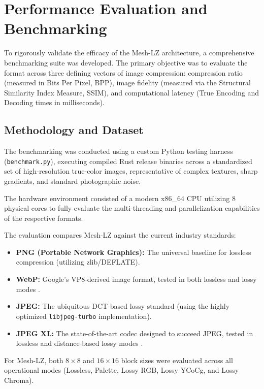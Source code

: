 \chapter{Performance Evaluation and Benchmarking}
\label{ch:evaluation}

To rigorously validate the efficacy of the Mesh-LZ architecture, a comprehensive benchmarking suite was developed. The primary objective was to evaluate the format across three defining vectors of image compression: compression ratio (measured in Bits Per Pixel, BPP), image fidelity (measured via the Structural Similarity Index Measure, SSIM), and computational latency (True Encoding and Decoding times in milliseconds).

\section{Methodology and Dataset}

The benchmarking was conducted using a custom Python testing harness (\texttt{benchmark.py}), executing compiled Rust release binaries across a standardized set of high-resolution true-color images, representative of complex textures, sharp gradients, and standard photographic noise. 

The hardware environment consisted of a modern x86\_64 CPU utilizing 8 physical cores to fully evaluate the multi-threading and parallelization capabilities of the respective formats. 

The evaluation compares Mesh-LZ against the current industry standards:
\begin{itemize}
    \item \textbf{PNG (Portable Network Graphics):} The universal baseline for lossless compression (utilizing zlib/DEFLATE).
    \item \textbf{WebP:} Google's VP8-derived image format, tested in both lossless and lossy modes \cite{google2010webp}.
    \item \textbf{JPEG:} The ubiquitous DCT-based lossy standard (using the highly optimized \texttt{libjpeg-turbo} implementation).
    \item \textbf{JPEG XL:} The state-of-the-art codec designed to succeed JPEG, tested in lossless and distance-based lossy modes \cite{alakuijala2019jpeg}.
\end{itemize}

For Mesh-LZ, both $8 \times 8$ and $16 \times 16$ block sizes were evaluated across all operational modes (Lossless, Palette, Lossy RGB, Lossy YCoCg, and Lossy Chroma).

